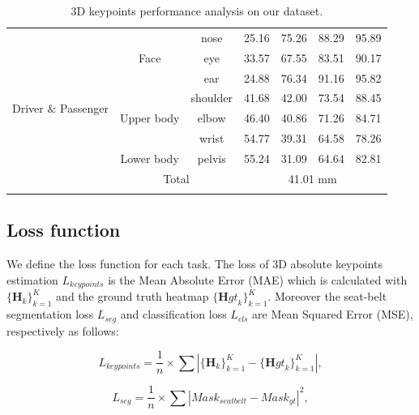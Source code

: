 \documentclass[letterpaper]{article} %
\begin{document}
\begin{table}[t]
\begin{tabular}{@{}c | c | c | c | c | c |c @{} }
    \multirow{8}{*}{Driver $\&$ Passenger} &\multirow{3}{*}{Face} & nose  & 25.16 & 75.26  & 88.29       & 95.89 \\\cline{ 3-7}
                            & &eye      & 33.57 & 67.55 & 83.51 & 90.17 \\\cline{3-7}
                            & &ear      & 24.88 & 76.34 & 91.16 & 95.82 \\\cline{ 2-7}
                            &\multirow{3}{*}{Upper body}&shoulder & 41.68 & 42.00 & 73.54 & 88.45 \\\cline{ 3-7}
                            & & elbow      & 46.40 & 40.86 & 71.26 & 84.71 \\\cline{ 3-7}
                            & & wrist      & 54.77 & 39.31 & 64.58 & 78.26 \\\cline{ 2-7}
                            &Lower body& pelvis      & 55.24 & 31.09 & 64.64 & 82.81\\\cline{ 2-7}
                            & \multicolumn{2}{c|}{Total} & \multicolumn{4}{c}{41.01 mm}\\\Xhline{3\arrayrulewidth}

    \Xhline{3\arrayrulewidth}
    \end{tabular}%
    \caption{3D keypoints performance analysis on our dataset.}
    \label{tab:mpjpe}
\end{table}

\subsection{Loss function}
We define the loss function for each task. The loss of 3D absolute keypoints estimation ${L}_{keypoints}$ is the Mean Absolute Error (MAE) which is calculated with $\{{\mathbf H}_{k}\}_{k=1}^{K}$ and the ground truth heatmap $\{{\mathbf Hgt}_{k}\}_{k=1}^{K}$. Moreover the seat-belt segmentation loss ${L}_{seg}$ and classification loss ${L}_{cls}$ are Mean Squared Error (MSE), respectively as follows:

\begin{equation} \label{4}
{{L}_{keypoints} = \frac{1}{n}\times\sum\left|\{{\mathbf H}_{k}\}_{k=1}^{K} - \{{\mathbf Hgt}_{k}\}_{k=1}^{K}\right|},
\end{equation}

\begin{equation} \label{5}
{{L}_{seg} = \frac{1}{n}\times{\sum\left|{Mask}_{seatbelt} - {Mask}_{gt}\right|}^2},
\end{equation}
\end{document}
